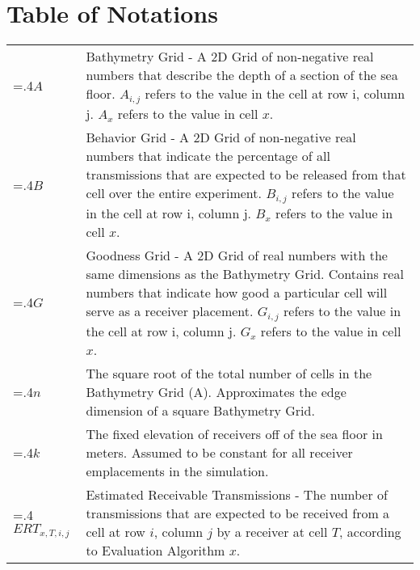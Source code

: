 
\chapter{Table of Notations}
\noindent\begin{tabularx}{\linewidth}{@{}>{\hsize=.4\hsize}X>{\hsize=1.5\hsize}X@{}}
	
	$A$ & Bathymetry Grid - A 2D Grid of  non-negative real numbers that describe the depth of a section of the sea floor.  $A_{i,j}$ refers to the value in the cell at row i, column j.  $A_{x}$ refers to the value in cell $x$.\\

	$B$ & Behavior Grid - A 2D Grid of  non-negative real numbers that indicate the percentage of all transmissions that are expected to be released from that cell over the entire experiment.  $B_{i,j}$ refers to the value in the cell at row i, column j.  $B_{x}$ refers to the value in cell $x$.\\
	
	$G$ & Goodness Grid - A 2D Grid of real numbers with the same dimensions as the Bathymetry Grid.  Contains real numbers that indicate how good a particular cell will serve as a receiver placement.  $G_{i,j}$ refers to the value in the cell at row i, column j.  $G_{x}$ refers to the value in cell $x$.\\

	$n$ & The square root of the total number of cells in the Bathymetry Grid (A).  Approximates the edge dimension of a square Bathymetry Grid.\\

	$k$ & The fixed elevation of receivers off of the sea floor in meters.  Assumed to be constant for all receiver emplacements in the simulation.\\
	
	$ERT_{x,T,i,j}$ & Estimated Receivable Transmissions - The number of transmissions that are expected to be received from a cell at row $i$, column $j$ by a receiver at cell $T$, according to Evaluation Algorithm $x$.\\


\end{tabularx}
